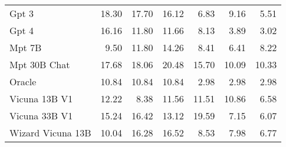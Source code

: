 \begin{table}
\begin{tabular}{l|rrr|rrr}
Gpt 3 & {\cellcolor[HTML]{91017A}} \color[HTML]{F1F1F1} 18.30 & {\cellcolor[HTML]{A5017D}} \color[HTML]{F1F1F1} 17.70 & {\cellcolor[HTML]{D82E94}} \color[HTML]{F1F1F1} 16.12 & {\cellcolor[HTML]{D0EDE9}} \color[HTML]{000000} 6.83 & {\cellcolor[HTML]{9AD8CA}} \color[HTML]{000000} 9.16 & {\cellcolor[HTML]{E0F3F5}} \color[HTML]{000000} 5.51 \\
Gpt 4 & {\cellcolor[HTML]{D62D93}} \color[HTML]{F1F1F1} 16.16 & {\cellcolor[HTML]{FBBBBD}} \color[HTML]{000000} 11.80 & {\cellcolor[HTML]{FCBFBE}} \color[HTML]{000000} 11.66 & {\cellcolor[HTML]{B4E2D8}} \color[HTML]{000000} 8.13 & {\cellcolor[HTML]{EFF9FB}} \color[HTML]{000000} 3.89 & {\cellcolor[HTML]{F7FCFD}} \color[HTML]{000000} 3.02 \\
Mpt 7B & {\cellcolor[HTML]{FEE6E3}} \color[HTML]{000000} 9.50 & {\cellcolor[HTML]{FBBBBD}} \color[HTML]{000000} 11.80 & {\cellcolor[HTML]{F76EA3}} \color[HTML]{F1F1F1} 14.26 & {\cellcolor[HTML]{ADE0D4}} \color[HTML]{000000} 8.41 & {\cellcolor[HTML]{D5EFED}} \color[HTML]{000000} 6.41 & {\cellcolor[HTML]{B2E2D7}} \color[HTML]{000000} 8.22 \\
Mpt 30B Chat & {\cellcolor[HTML]{A6017D}} \color[HTML]{F1F1F1} 17.68 & {\cellcolor[HTML]{99017B}} \color[HTML]{F1F1F1} 18.06 & {\cellcolor[HTML]{49006A}} \color[HTML]{F1F1F1} 20.48 & {\cellcolor[HTML]{1F8742}} \color[HTML]{F1F1F1} 15.70 & {\cellcolor[HTML]{84CFB9}} \color[HTML]{000000} 10.09 & {\cellcolor[HTML]{7DCCB5}} \color[HTML]{000000} 10.33 \\
Oracle & {\cellcolor[HTML]{FCCFCB}} \color[HTML]{000000} 10.84 & {\cellcolor[HTML]{FCCFCB}} \color[HTML]{000000} 10.84 & {\cellcolor[HTML]{FCCFCB}} \color[HTML]{000000} 10.84 & {\cellcolor[HTML]{F7FCFD}} \color[HTML]{000000} 2.98 & {\cellcolor[HTML]{F7FCFD}} \color[HTML]{000000} 2.98 & {\cellcolor[HTML]{F7FCFD}} \color[HTML]{000000} 2.98 \\
Vicuna 13B V1 & {\cellcolor[HTML]{FBB0BA}} \color[HTML]{000000} 12.22 & {\cellcolor[HTML]{FFF7F3}} \color[HTML]{000000} 8.38 & {\cellcolor[HTML]{FCC1BF}} \color[HTML]{000000} 11.56 & {\cellcolor[HTML]{62C09F}} \color[HTML]{000000} 11.51 & {\cellcolor[HTML]{70C6AC}} \color[HTML]{000000} 10.86 & {\cellcolor[HTML]{D3EEEB}} \color[HTML]{000000} 6.58 \\
Vicuna 33B V1 & {\cellcolor[HTML]{E94B9C}} \color[HTML]{F1F1F1} 15.24 & {\cellcolor[HTML]{CD238F}} \color[HTML]{F1F1F1} 16.42 & {\cellcolor[HTML]{FA97B2}} \color[HTML]{000000} 13.12 & {\cellcolor[HTML]{00441B}} \color[HTML]{F1F1F1} 19.59 & {\cellcolor[HTML]{CCECE6}} \color[HTML]{000000} 7.15 & {\cellcolor[HTML]{D9F1F0}} \color[HTML]{000000} 6.07 \\
Wizard Vicuna 13B & {\cellcolor[HTML]{FDDDDA}} \color[HTML]{000000} 10.04 & {\cellcolor[HTML]{D22891}} \color[HTML]{F1F1F1} 16.28 & {\cellcolor[HTML]{CA208D}} \color[HTML]{F1F1F1} 16.52 & {\cellcolor[HTML]{AADFD3}} \color[HTML]{000000} 8.53 & {\cellcolor[HTML]{B8E4DB}} \color[HTML]{000000} 7.98 & {\cellcolor[HTML]{D1EEE9}} \color[HTML]{000000} 6.77 \\

\bottomrule
\end{tabular}
            
\end{table}
